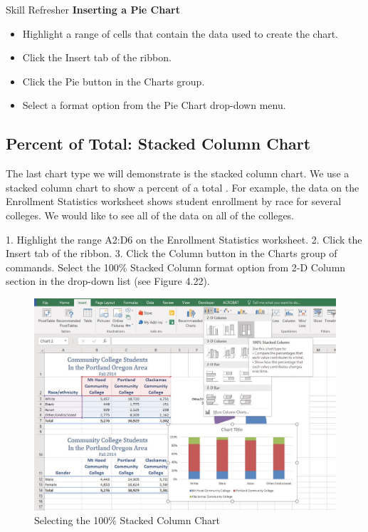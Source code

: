 \begin{center}
	\begin{sklbox}{Skill Refresher}
		\textbf{Inserting a Pie Chart}
		\\
		\begin{itemize}
			\setlength{\itemsep}{0pt}
			\setlength{\parskip}{0pt}
			\setlength{\parsep}{0pt}

			\item Highlight a range of cells that contain the data used to create the chart.
			\item Click the Insert tab of the ribbon.
			\item Click the Pie button in the Charts group.
			\item Select a format option from the Pie Chart drop-down menu.
			
		\end{itemize}
	\end{sklbox}
\end{center}


\subsection{Percent of Total: Stacked Column Chart}

The last chart type we will demonstrate is the stacked column chart. We use a stacked column chart to
show a percent of a total . For example, the data on the Enrollment Statistics worksheet shows student
enrollment by race for several colleges. We would like to see all of the data on all of the colleges.

1. Highlight the range A2:D6 on the Enrollment Statistics worksheet.
2. Click the Insert tab of the ribbon.
3. Click the Column button in the Charts group of commands. Select the 100\% Stacked Column
format option from 2-D Column section in the drop-down list (see Figure 4.22).



\begin{figure}[H]
	\centering
	\includegraphics[width=\maxwidth{.95\linewidth}]{gfx/ch04_fig23}
	\caption{Selecting the 100\% Stacked Column Chart}
	\label{04:fig23}
\end{figure}


